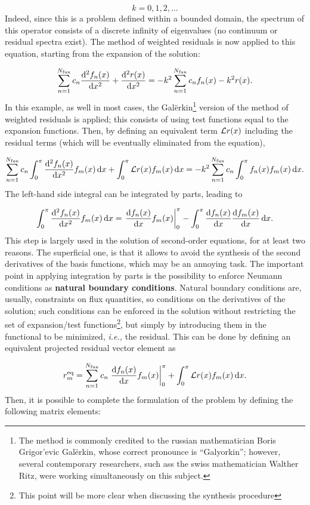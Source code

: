 \documentclass[a4paper,12pt]{article}
\begin{document}
\[
k = 0, 1, 2, ... 
\]
Indeed, since this is a problem defined within a bounded domain, the spectrum of this operator consists of a discrete infinity of eigenvalues (no continuum or residual spectra exist). The method of weighted residuals is now applied to this equation, starting from the expansion of the solution:

\[
\sum_{n=1}^{N_{\mathrm{fun}}} c_n \frac{\mathrm{d}^2 f_n(x)}{\mathrm{d} x^2} + \frac{\mathrm{d}^2 r(x)}{\mathrm{d} x^2} = - k^2 \sum_{n=1}^{N_{\mathrm{fun}}} c_n f_n(x) - k^2 r(x).
\]
In this example, as well in most cases, the Gal\"{e}rkin\footnote{The method is commonly credited to the russian mathematician Boris Grigor'evic Gal\"{e}rkin, whose correct pronounce is ``Galyorkin''; however, several contemporary researchers, such ass the swiss mathematician Walther Ritz, were working simultaneously on this subject.} version of the method of weighted residuals is applied; this consists of using test functions equal to the expansion functions. Then, by defining an equivalent term $\mathcal{L} r(x)$ including the residual terms (which will be eventually eliminated from the equation),

\[
\sum_{n=1}^{N_{\mathrm{fun}}} c_n \int_0^\pi \frac{\mathrm{d}^2 f_n(x)}{\mathrm{d} x^2} f_m(x) \, \mathrm{d} x + \int_0^\pi \mathcal{L} r(x) f_m(x) \, \mathrm{d} x = - k^2 \sum_{n=1}^{N_{\mathrm{fun}}} c_n \int_0^\pi f_n(x) f_m(x) \, \mathrm{d} x.
\]
The left-hand side integral can be integrated by parts, leading to

\[
\int_0^\pi \frac{\mathrm{d}^2 f_n(x)}{\mathrm{d} x^2} f_m(x) \, \mathrm{d} x = \left. \frac{\mathrm{d} f_n(x)}{\mathrm{d} x} f_m(x) \right|_0^\pi - \int_0^\pi \frac{\mathrm{d} f_n(x)}{\mathrm{d} x} \frac{\mathrm{d} f_m(x)}{\mathrm{d} x} \, \mathrm{d} x.
\]
This step is largely used in the solution of second-order equations, for at least two reasons. The superficial one, is that it allows to avoid the synthesis of the second derivatives of the basis functions, which may be an annoying task. The important point in applying integration by parts is the possibility to enforce Neumann conditions as \textbf{natural boundary conditions}. Natural boundary conditions are, usually, constraints on flux quantities, so conditions on the derivatives of the solution; such conditions can be enforced in the solution without restricting the set of expansion/test functions\footnote{This point will be more clear when discussing the synthesis procedure}, but simply by introducing them in the functional to be minimized, \textit{i.e.,} the residual. This can be done by defining an equivalent projected residual vector element as

\[
r_m^{\mathrm{eq}} = \sum_{n=1}^{N_{\mathrm{fun}}} c_n \left. \frac{\mathrm{d} f_n(x)}{\mathrm{d} x} f_m(x) \right|_0^\pi + \int_0^\pi \mathcal{L} r(x) f_m(x) \, \mathrm{d} x.
\]
Then, it is possible to complete the formulation of the problem by defining the following matrix elements:
\end{document}
